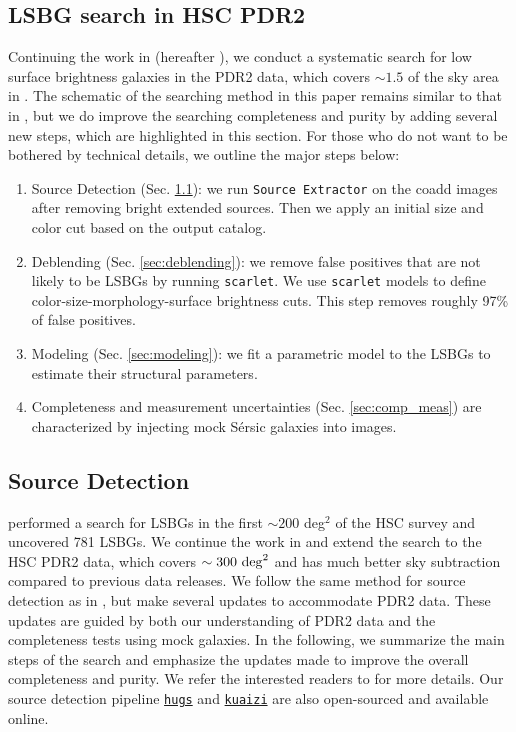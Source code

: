 \documentclass[twocolumn,astrosymb,twocolappendix]{aastex631}
\newcommand{\code}[1]{\texttt{#1}}
\newcommand{\sersic}{S\'ersic}
\begin{document}
\begin{CJK*}{UTF8}{gbsn}
\section{LSBG search in HSC PDR2}
Continuing the work in \citet{Greco2018} (hereafter ), we conduct a systematic search for low surface brightness galaxies in the PDR2 data, which covers $\sim 1.5$ of the sky area in . The schematic of the searching method in this paper remains similar to that in , but we do improve the searching completeness and purity by adding several new steps, which are highlighted in this section. For those who do not want to be bothered by technical details, we outline the major steps below:
\begin{enumerate}
    \item Source Detection (Sec. \ref{sec:detection}): we run \code{Source Extractor} on the coadd images after removing bright extended sources. Then we apply an initial size and color cut based on the output catalog. 
    \item Deblending (Sec. \ref{sec:deblending}): we remove false positives that are not likely to be LSBGs by running \code{scarlet}. We use \code{scarlet} models to define color-size-morphology-surface brightness cuts. This step removes roughly 97\% of false positives.
    \item Modeling (Sec. \ref{sec:modeling}): we fit a parametric model to the LSBGs to estimate their structural parameters. 
    \item Completeness and measurement uncertainties (Sec. \ref{sec:comp_meas}) are characterized by injecting mock \sersic{} galaxies into images. 
\end{enumerate}

\subsection{Source Detection}\label{sec:detection}
 performed a search for LSBGs in the first $\sim 200$ deg$^2$ of the HSC survey and uncovered 781 LSBGs. We continue the work in  and extend the search to the HSC PDR2 data, which covers $\sim 300\ \rm{deg}^{2}$ and has much better sky subtraction compared to previous data releases. We follow the same method for source detection as in , but make several updates to accommodate PDR2 data. These updates are guided by both our understanding of PDR2 data and the completeness tests using mock galaxies. In the following, we summarize the main steps of the search and emphasize the updates made to improve the overall completeness and purity. We refer the interested readers to  for more details. Our source detection pipeline \href{https://github.com/johnnygreco/hugs}{\code{hugs}} and \href{https://github.com/AstroJacobLi/kuaizi}{\code{kuaizi}} are also open-sourced and available online.


\end{CJK*}
\end{document}
